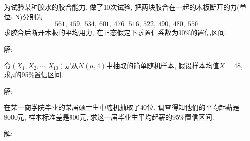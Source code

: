 \documentclass[standard]{ExBook}
\begin{document}

\section{}

\begin{qitems}
    \begin{bbox}
    \begin{shaded}
        \qitem 
为试验某种胶水的胶合能力, 做了10次试验, 把两块胶合在一起的木板断开的力(单位: N)分别为
$$561,\ 459,\ 534,\ 601,\ 476,\ 516,\ 522,\ 490,\ 480,\ 550$$
求胶合后断开木板的平均用力, 在正态假定下求置信系数为90\%的置信区间.
    \end{shaded}
    \end{bbox}

\vspace{-5em}

    \begin{bbox}
解: 
    \end{bbox}

\vspace{-5em}

    \begin{bbox}
    \begin{shaded}
        \qitem
令$(X_1,X_2,\cdots,X_{10})$是从$N(\mu,4)$中抽取的简单随机样本, 假设样本均值$\overline{X}=48$, 求$\mu$的95\%置信区间.
    \end{shaded}
    \end{bbox}

\vspace{-5em}

    \begin{bbox}
解: 
    \end{bbox}

\vspace{-5em}

    \begin{bbox}
    \begin{shaded}
        \qitem
在某一商学院毕业的某届硕士生中随机抽取了40位, 调查得知他们的平均起薪是8000元, 样本标准差是900元, 求这一届毕业生平均起薪的95\%置信区间.
    \end{shaded}
    \end{bbox}

\vspace{-5em}

    \begin{bbox}
解: 
    \end{bbox}


\end{qitems}
\end{document}
